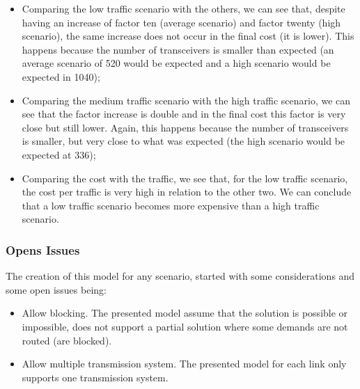 \begin{itemize}
    \item Comparing the low traffic scenario with the others, we can see that, despite having an increase of factor ten (average scenario) and factor twenty (high scenario), the same increase does not occur in the final cost (it is lower). This happens because the number of transceivers is smaller than expected (an average scenario of 520 would be expected and a high scenario would be expected in 1040);
    \item Comparing the medium traffic scenario with the high traffic scenario, we can see that the factor increase is double and in the final cost this factor is very close but still lower. Again, this happens because the number of transceivers is smaller, but very close to what was expected (the high scenario would be expected at 336);
    \item Comparing the cost with the traffic, we see that, for the low traffic scenario, the cost per traffic is very high in relation to the other two. We can conclude that a low traffic scenario becomes more expensive than a high traffic scenario.
\end{itemize}


\vspace{13pt}
\subsubsection{Opens Issues}

The creation of this model for any scenario, started with some considerations and some open issues being:

\begin{itemize}
  \item Allow blocking.
  \subitem The presented model assume that the solution is possible or impossible, does not support a partial solution where some demands are not routed (are blocked).
  \item Allow multiple transmission system.
  \subitem The presented model for each link only supports one transmission system.
\end{itemize}

